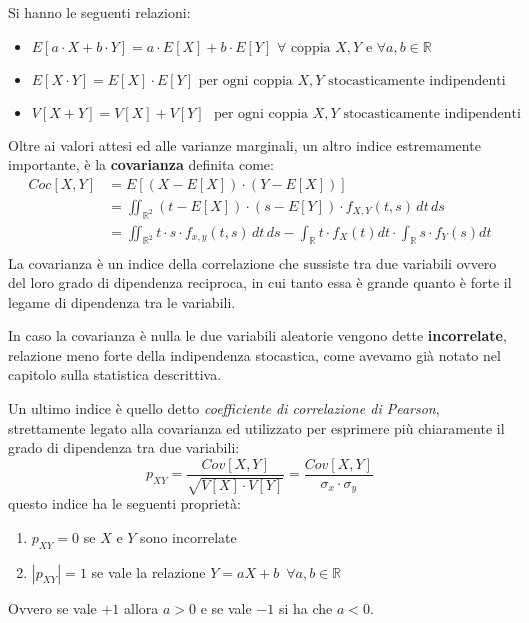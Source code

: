 \documentclass[a4paper,12pt, oneside]{book}
\newcommand{\numberset}{\mathbb}
\newcommand{\R}{\numberset{R}}
\begin{document}
Si hanno le seguenti relazioni:
\begin{itemize}
    \item $E[a\cdot X + b \cdot Y] = a\cdot E[X] + b\cdot E[Y]\,\,\forall \mbox{ coppia }X,Y \mbox{ e }
                                     \forall a,b \in \R$
    \item $E[X \cdot Y] = E[X]\cdot E[Y]\,\,\mbox{per ogni coppia }X,Y \mbox{ stocasticamente indipendenti}$
    \item $V[X + Y]= V[X] + V[Y]\,\, \mbox{ per ogni coppia }X,Y \mbox{ stocasticamente indipendenti}$
\end{itemize}
Oltre ai valori attesi ed alle varianze marginali, un altro indice estremamente importante, 
è la \textbf{covarianza} definita come:
\[ \begin{split}
    Coc[X, Y] & = E[(X-E[X])\cdot(Y-E[X])]\\ 
              & = \iint_{\R^2} (t - E[X])\cdot (s - E[Y])\cdot f_{X,Y}(t,s)\,dt\,ds\\
              & = \iint_{\R^2} t \cdot s\cdot f_{x,y}(t,s)\,dt\,ds 
                  - \int_{\R} t \cdot f_X(t) dt \cdot \int_{\R}s \cdot f_Y(s)dt \\
    \end{split} \]
La covarianza è un indice della correlazione che sussiste tra due variabili ovvero del loro grado di
dipendenza reciproca, in cui tanto essa è grande quanto è forte il legame di dipendenza tra le variabili.

In caso la covarianza è nulla le due variabili aleatorie vengono dette \textbf{incorrelate}, relazione 
meno forte della indipendenza stocastica, come avevamo già notato nel capitolo sulla statistica descrittiva.

Un ultimo indice è quello detto \emph{coefficiente di correlazione di Pearson}, strettamente legato 
alla covarianza ed utilizzato per esprimere più chiaramente il grado di dipendenza tra due variabili:
\[p_{XY} = \frac{Cov[X,Y]}{\sqrt{V[X]\cdot V[Y]}} = \frac{Cov[X,Y]}{\sigma_x\cdot \sigma_y}\]
questo indice ha le seguenti proprietà:
\begin{enumerate}
    \item $p_{XY}=0$ se $X$ e $Y$ sono incorrelate
    \item $|p_{XY}|=1$ se vale la relazione $Y= aX + b\,\,\,\forall a,b \in \R$
\end{enumerate}
Ovvero se vale $+1$ allora $a>0$ e se vale $-1$ si ha che $a<0$.
\end{document}
